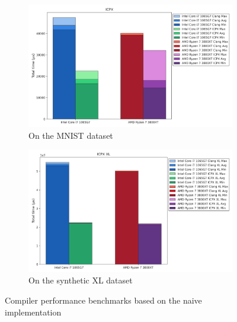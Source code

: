 \documentclass[modern,longauthor]{aastex7}
\begin{document}
\begin{figure}[htb!]
\centering
\begin{subfigure}{.5\textwidth}
  \centering
  \includegraphics[width=\linewidth]{Graphs/ICPX.png}
  \caption{On the MNIST dataset}
 \label{fig:icpx_mnist}
\end{subfigure}%
\begin{subfigure}{.5\textwidth}
  \centering
  \includegraphics[width=\linewidth]{Graphs/ICPX XL.png}
  \caption{On the synthetic XL dataset}
 \label{fig:icpx_xl}
\end{subfigure}
\caption{Compiler performance benchmarks based on the naive implementation}
\label{fig:icpx}
\end{figure}
\end{document}
